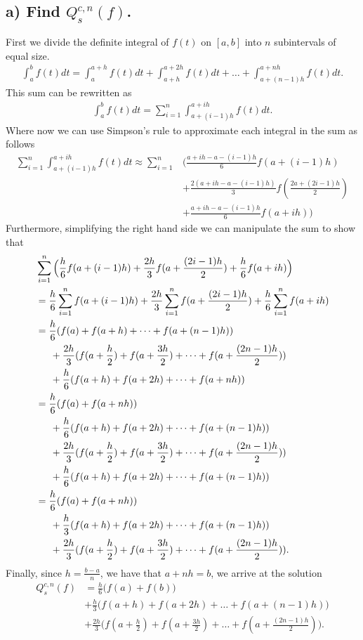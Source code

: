\documentclass[11pt, letterpaper]{article}
\begin{document}
\subsection*{a) \normalfont Find $Q_s^{c,n}(f)$.}
First we divide the definite integral of $f(t)$ on $[a,b]$ into $n$ subintervals of equal size.
\begin{align*}
    \int_a^b f(t)dt=\int_a^{a+h} f(t)dt +\int_{a+h}^{a+2h}f(t)dt +\dots+ \int_{a+(n-1)h}^{a+nh}f(t)dt.
\end{align*}
This sum can be rewritten as
\begin{align*}
    \int_a^b f(t)dt=\sum_{i=1}^n \int_{a+(i-1)h}^{a+ih}f(t)dt.
\end{align*}
Where now we can use Simpson's rule to approximate each integral in the sum as follows
\begin{align*}
    \sum_{i=1}^n \int_{a+(i-1)h}^{a+ih}f(t)dt\approx \sum_{i=1}^n &\Big(\frac{a+ih-a-(i-1)h}{6}f(a+(i-1)h)\\
    &+\frac{2(a+ih-a-(i-1)h)}{3}f(\frac{2a+(2i-1)h}{2})\\
    &+\frac{a+ih-a-(i-1)h}{6}f(a+ih)\Big)
\end{align*}
\newpage
Furthermore, simplifying the right hand side we can manipulate the sum to show that
\begin{align*}
    &\sum_{i=1}^n \Big(\frac{h}{6}f(a+(i-1)h)+\frac{2h}{3}f(a+\frac{(2i-1)h}{2})+\frac{h}{6}f(a+ih)\Big)\\
    &=\frac{h}{6}\sum_{i=1}^n f(a+(i-1)h)+\frac{2h}{3}\sum_{i=1}^n f(a+\frac{(2i-1)h}{2})+\frac{h}{6}\sum_{i=1}^n f(a+ih)\\
    &=\frac{h}{6}(f(a)+f(a+h)+\dots+f(a+(n-1)h))\\
    &\indent+\frac{2h}{3}(f(a+\frac{h}{2})+f(a+\frac{3h}{2})+\dots+f(a+\frac{(2n-1)h}{2}))\\
    &\indent+\frac{h}{6}(f(a+h)+f(a+2h)+\dots+f(a+nh))\\
    &=\frac{h}{6}(f(a)+f(a+nh))\\
    &\indent+\frac{h}{6}(f(a+h)+f(a+2h)+\dots+f(a+(n-1)h))\\
    &\indent+\frac{2h}{3}(f(a+\frac{h}{2})+f(a+\frac{3h}{2})+\dots+f(a+\frac{(2n-1)h}{2}))\\
    &\indent+\frac{h}{6}(f(a+h)+f(a+2h)+\dots+f(a+(n-1)h))\\
    &=\frac{h}{6}(f(a)+f(a+nh))\\
    &\indent+\frac{h}{3}(f(a+h)+f(a+2h)+\dots+f(a+(n-1)h))\\
    &\indent+\frac{2h}{3}(f(a+\frac{h}{2})+f(a+\frac{3h}{2})+\dots+f(a+\frac{(2n-1)h}{2})).
\end{align*}
Finally, since $h=\frac{b-a}{n}$, we have that $a+nh=b$, we arrive at the solution
\begin{align*}
    Q_s^{c,n}(f)&=\frac{h}{6}\big(f(a)+f(b)\big)\\
    &+\frac{h}{3}\big(f(a+h)+f(a+2h)+\dots+f(a+(n-1)h)\big)\\
    &+\frac{2h}{3}\big(f(a+\frac{h}{2})+f(a+\frac{3h}{2})+\dots+f(a+\frac{(2n-1)h}{2})\big).
\end{align*}
\end{document}
